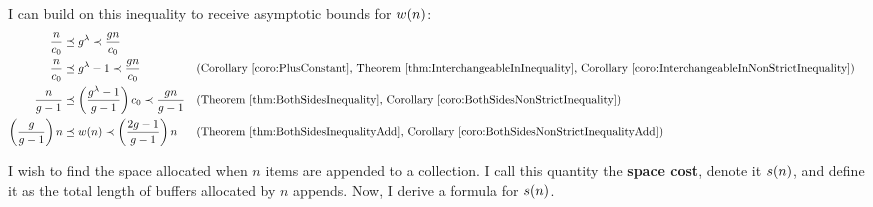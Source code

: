 I can build on this inequality to receive asymptotic bounds for $w(n)$:
\begin{align*}
\frac n {c_0} &\preceq g^\lambda \prec \frac {g{n}} {c_0}\\
\frac n {c_0} &\preceq g^\lambda - 1 \prec \frac {g{n}} {c_0} &&\text{(Corollary \ref{coro:PlusConstant}, Theorem \ref{thm:InterchangeableInInequality}, Corollary \ref{coro:InterchangeableInNonStrictInequality})}\\
\frac n {g - 1} &\preceq \left( \frac{g^\lambda - 1}{g - 1} \right) c_0 \prec \frac {g{n}} {g - 1} &&\text{(Theorem \ref{thm:BothSidesInequality}, Corollary \ref{coro:BothSidesNonStrictInequality})}\\
\left( \frac{g}{g - 1} \right) n &\preceq w(n) \prec \left( \frac{2g - 1}{g - 1} \right) n &&\text{(Theorem \ref{thm:BothSidesInequalityAdd}, Corollary \ref{coro:BothSidesNonStrictInequalityAdd})}
\end{align*}
\HdrSpaceComplex

I wish to find the space allocated when $n$ items are appended to a collection. I call this quantity the \textbf{space cost}, denote it $s(n)$, and define it as the total length of buffers allocated by $n$ appends. Now, I derive a formula for $s(n)$.


